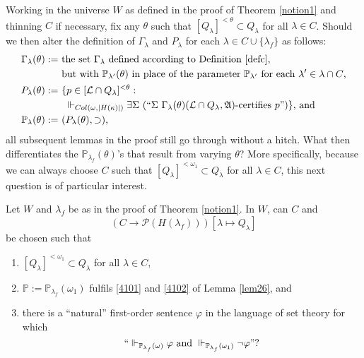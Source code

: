 \documentclass[12pt]{article}
\numberwithin{equation}{section}
\begin{document}
Working in the universe $W$ as defined in the proof of Theorem \ref{notion1} and thinning $C$ if necessary, fix any $\theta$ such that $[Q_{\lambda}]^{< \theta} \subset Q_{\lambda}$ for all $\lambda \in C$. Should we then alter the definition of $\Gamma_{\lambda}$ and $P_{\lambda}$ for each $\lambda \in C \cup \{\lambda_f\}$ as follows:
\begin{align*}
    \Gamma_{\lambda}(\theta) := \ & \text{the set } \Gamma_{\lambda} \text{ defined according to Definition \ref{defc},} \\
    & \text{but with } \mathbb{P}_{\lambda'}(\theta) \text{ in place of the parameter } \mathbb{P}_{\lambda'} \text{ for each } \lambda' \in \lambda \cap C \text{,} \\
    P_{\lambda}(\theta) := \ & \{p \in [\mathcal{L} \cap Q_{\lambda}]^{< \theta} : \\
    & \ \Vdash_{Col(\omega, |H(\kappa)|)} \exists \Sigma \ (``\Sigma \ \Gamma_{\lambda}(\theta) (\mathcal{L} \cap Q_{\lambda}, \mathfrak{A}) \text{-certifies } p")\} \text{, and} \\
    \mathbb{P}_{\lambda}(\theta) := \ & (P_{\lambda}(\theta), \supset) \text{,}
\end{align*}
all subsequent lemmas in the proof still go through without a hitch. What then differentiates the $\mathbb{P}_{\lambda_f}(\theta)$'s that result from varying $\theta$? More specifically, because we can always choose $C$ such that $[Q_{\lambda}]^{< \omega_1} \subset Q_{\lambda}$ for all $\lambda \in C$, this next question is of particular interest.

\begin{ques}\label{oq1}
Let $W$ and $\lambda_f$ be as in the proof of Theorem \ref{notion1}. In $W$, can $C$ and $$(C \longrightarrow \mathcal{P}(H(\lambda_f))) [\lambda \mapsto Q_{\lambda}]$$ be chosen such that 
\begin{enumerate}[label=(\arabic*)]
    \item $[Q_{\lambda}]^{< \omega_1} \subset Q_{\lambda}$ for all $\lambda \in C$,
    \item $\mathbb{P} := \mathbb{P}_{\lambda_f}(\omega_1)$ fulfils \ref{4101} and \ref{4102} of Lemma \ref{lem26}, and
    \item there is a ``natural'' first-order sentence $\varphi$ in the language of set theory for which $$``\Vdash_{\mathbb{P}_{\lambda_f}(\omega)} \varphi \text{ and } \Vdash_{\mathbb{P}_{\lambda_f}(\omega_1)} \neg \varphi" \text{?}$$
\end{enumerate}
\end{ques}
\end{document}
